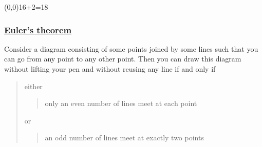 \begin{frame}
{\begin{center}
{\em \underline{}}
\end{center}
}%
%
\end{frame}
\begin{frame}\begin{textblock}{1}(0,0)16+2=18\end{textblock}\frametitle{{\color{red}\underline{\Large\bf
}}}\frametitle{\underline{\Large\bf
Euler's theorem}}
Consider a diagram consisting of some points
joined by some lines such that you can go from any point to any
other point. Then you can draw this diagram without lifting your
pen and without  reusing any line if and only if 

\begin{quote}
either 
  
\begin{quote}
only an even number of lines meet at each point
\end{quote}

or

\begin{quote}
an odd number of lines meet at exactly two points
\end{quote}
  

\end{quote}

\end{frame}
